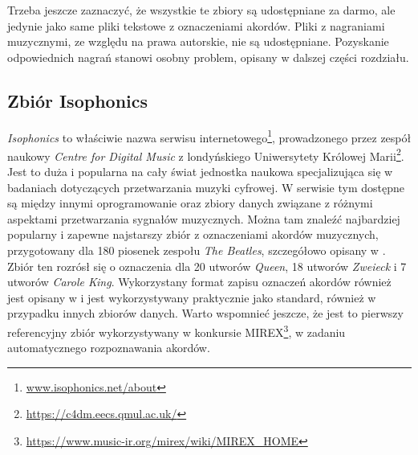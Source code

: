 \begin{table}
    \centering
    \caption{Fragment indeksu zbioru danych po pierwszym etapie jego tworzenia.}
    \label{tab:indeks_01}
\end{table}

Trzeba jeszcze zaznaczyć, że wszystkie te zbiory są udostępniane za darmo, ale jedynie jako same pliki tekstowe z oznaczeniami akordów. Pliki z nagraniami muzycznymi, ze względu na prawa autorskie, nie są udostępniane. Pozyskanie odpowiednich nagrań stanowi osobny problem, opisany w dalszej części rozdziału.

\subsection{Zbiór Isophonics}

\emph{Isophonics} to właściwie nazwa serwisu internetowego\footnote{\url{www.isophonics.net/about}}, prowadzonego przez zespół naukowy \emph{Centre for Digital Music} z londyńskiego Uniwersytety Królowej Marii\footnote{\url{https://c4dm.eecs.qmul.ac.uk/}}. Jest to duża i popularna na cały świat jednostka naukowa specjalizująca się w badaniach dotyczących przetwarzania muzyki cyfrowej. W serwisie tym dostępne są między innymi oprogramowanie oraz zbiory danych związane z różnymi aspektami przetwarzania sygnałów muzycznych.  Można tam znaleźć najbardziej popularny i zapewne najstarszy zbiór z oznaczeniami akordów muzycznych, przygotowany dla 180 piosenek zespołu \emph{The Beatles}, szczegółowo opisany w \cite{harte_towards_nodate}. Zbiór ten rozrósł się o oznaczenia dla 20 utworów \emph{Queen}, 18 utworów \emph{Zweieck} i 7 utworów \emph{Carole King}. Wykorzystany format zapisu oznaczeń akordów również jest opisany w \cite{harte_towards_nodate} i jest wykorzystywany praktycznie jako standard, również w przypadku innych zbiorów danych. Warto wspomnieć jeszcze, że jest to pierwszy referencyjny zbiór wykorzystywany w konkursie MIREX\footnote{\url{https://www.music-ir.org/mirex/wiki/MIREX_HOME}}, w zadaniu automatycznego rozpoznawania akordów.

